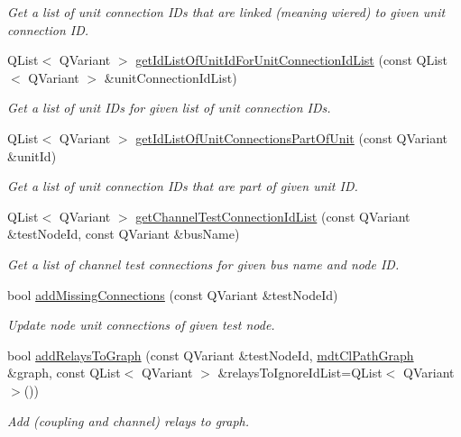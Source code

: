\begin{DoxyCompactItemize}
\begin{DoxyCompactList}\small\item\em Get a list of unit connection I\-Ds that are linked (meaning wiered) to given unit connection I\-D. \end{DoxyCompactList}\item 
Q\-List$<$ Q\-Variant $>$ \hyperlink{classmdt_tt_test_node_a6e72542d6a7e1773cc228d9cfc9f3be8}{get\-Id\-List\-Of\-Unit\-Id\-For\-Unit\-Connection\-Id\-List} (const Q\-List$<$ Q\-Variant $>$ \&unit\-Connection\-Id\-List)
\begin{DoxyCompactList}\small\item\em Get a list of unit I\-Ds for given list of unit connection I\-Ds. \end{DoxyCompactList}\item 
Q\-List$<$ Q\-Variant $>$ \hyperlink{classmdt_tt_test_node_aedbfa25bedac04b859b1cb3ef6a16510}{get\-Id\-List\-Of\-Unit\-Connections\-Part\-Of\-Unit} (const Q\-Variant \&unit\-Id)
\begin{DoxyCompactList}\small\item\em Get a list of unit connection I\-Ds that are part of given unit I\-D. \end{DoxyCompactList}\item 
Q\-List$<$ Q\-Variant $>$ \hyperlink{classmdt_tt_test_node_a07b8cd098d61c3f14d3ba226c1d1f1cb}{get\-Channel\-Test\-Connection\-Id\-List} (const Q\-Variant \&test\-Node\-Id, const Q\-Variant \&bus\-Name)
\begin{DoxyCompactList}\small\item\em Get a list of channel test connections for given bus name and node I\-D. \end{DoxyCompactList}\item 
bool \hyperlink{classmdt_tt_test_node_a65478d5d026969e8b17464707fc3551d}{add\-Missing\-Connections} (const Q\-Variant \&test\-Node\-Id)
\begin{DoxyCompactList}\small\item\em Update node unit connections of given test node. \end{DoxyCompactList}\item 
bool \hyperlink{classmdt_tt_test_node_ade83e368a3cff8fe6704e3c194d5e211}{add\-Relays\-To\-Graph} (const Q\-Variant \&test\-Node\-Id, \hyperlink{classmdt_cl_path_graph}{mdt\-Cl\-Path\-Graph} \&graph, const Q\-List$<$ Q\-Variant $>$ \&relays\-To\-Ignore\-Id\-List=Q\-List$<$ Q\-Variant $>$())
\begin{DoxyCompactList}\small\item\em Add (coupling and channel) relays to graph. \end{DoxyCompactList}\item 

\end{DoxyCompactItemize}
